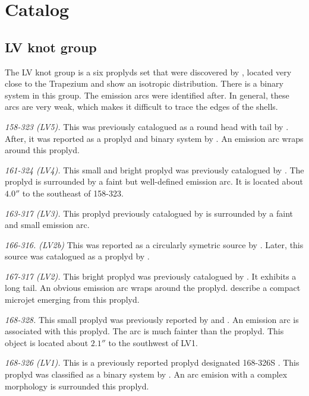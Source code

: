 \documentclass[apj, twocolumn]{aastex63}
\begin{document}
\section{Catalog}
\label{sec:catalog}

\subsection{LV knot group}
\label{sec:lv-group}



The LV knot group is a six proplyds set that were discovered by
\citet{Laques:1979a}, located very close to the Trapezium and show
an isotropic distribution. There is a binary system in this group.
The emission arcs were identified after. In general, these arcs
are very weak, which makes it difficult to trace the edges of the
shells.

\textit{158-323 (LV5).} This was previously catalogued as a round
head with tail by \citet{ODell:1996a}. After, it was reported
as a proplyd and binary system by \citep{Ricci:2008a}. An emission
arc wraps around this proplyd. 
 
\textit{161-324 (LV4).} This small and bright proplyd was
previously catalogued by \citet{ODell:1996a, Ricci:2008a}. The
proplyd is surrounded by a faint but well-defined emission arc.
It is located about \(4.0''\) to the southeast of 158-323.

\textit{163-317 (LV3).} This proplyd previously catalogued by
\citet{ODell:1996a, Ricci:2008a} is surrounded by a faint and
small emission arc. 

\textit{166-316. (LV2b)} This was reported as a circularly symetric
source by \citet{ODell:1996a}. Later, this source was catalogued as
a proplyd by \citet{Ricci:2008a}. 

\textit{167-317 (LV2).} This bright proplyd was previously catalogued
by \citet{ODell:1994a, Ricci:2008a}. It exhibits a long tail. An
obvious emission arc \citep{Bally:2000a} wraps around the proplyd.
\citet{Bally:2000a} describe a compact microjet emerging from this
proplyd. 

\textit{168-328.} This small proplyd was previously reported
by \citet{ODell:1994a} and \citet{Ricci:2008a}. An emission arc is
associated with this proplyd. The arc is much fainter than the
proplyd. This object is located about \(2.1''\) to the southwest
of LV1.  

\textit{168-326 (LV1).} This is a previously reported proplyd
designated 168-326S \citep{ODell:1994a}. This proplyd was classified
as a binary system by \citet{Ricci:2008a}. An arc emision with a
complex morphology is surrounded this proplyd.
\end{document}
